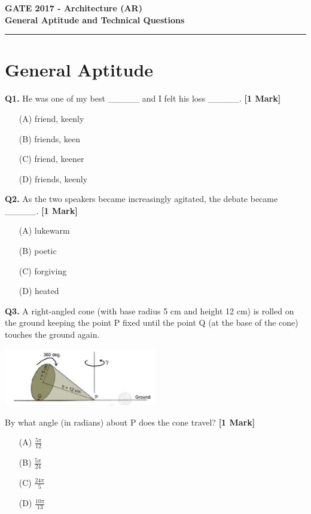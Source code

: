 \documentclass[11pt]{article}
\newcommand{\questiona}[2]{
    \noindent\textbf{Q#2.} #1 \hfill \textbf{[1 Mark]}
}
\begin{document}
\begin{center}
    \Large\textbf{GATE 2017 - Architecture (AR)} \\
    \large\textbf{General Aptitude and Technical Questions} \\
    \rule{\textwidth}{0.5pt} %
\end{center}

\vspace{0.5cm}

\section*{General Aptitude}

\questiona{He was one of my best \_\_\_\_\_ and I felt his loss \_\_\_\_\_.}{1}
\begin{enumerate}
    \item[(A)] friend, keenly
    \item[(B)] friends, keen  
    \item[(C)] friend, keener
    \item[(D)] friends, keenly
\end{enumerate}

\vspace{0.5cm}

\questiona{As the two speakers became increasingly agitated, the debate became \_\_\_\_\_.}{2}
\begin{enumerate}
    \item[(A)] lukewarm
    \item[(B)] poetic  
    \item[(C)] forgiving
    \item[(D)] heated
\end{enumerate}

\vspace{0.5cm}

\questiona{A right-angled cone (with base radius 5 cm and height 12 cm) is rolled on the ground keeping the point P fixed until the point Q (at the base of the cone) touches the ground again.
\begin{center}
    \includegraphics[width=0.5\textwidth]{figures/3.png}
\end{center}
By what angle (in radians) about P does the cone travel?}{3}
\begin{enumerate}
    \item[(A)] $\frac{5\pi}{12}$
    \item[(B)] $\frac{5\pi}{24}$  
    \item[(C)] $\frac{24\pi}{5}$
    \item[(D)] $\frac{10\pi}{13}$
\end{enumerate}
\end{document}
